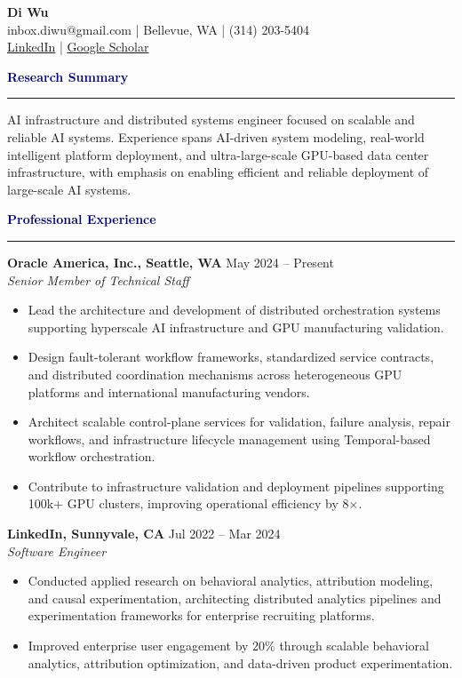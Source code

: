 \documentclass[letter,10pt]{article}
\newcommand{\cvsection}[1]{%
  \vspace{0.5em}
  {\large\textbf{\textcolor{navy}{#1}}}\par
  \vspace{0.15em}
  \hrule
  \vspace{0.35em}
}
\newcommand{\cventry}[3]{%
  \textbf{#1} \hfill #2\\
  \textit{#3}\par
}
\begin{document}
\begin{center}
{\LARGE \textbf{Di Wu}}\\[0.15em]
inbox.diwu@gmail.com \;|\; Bellevue, WA \;|\; (314) 203-5404\\
\href{https://www.linkedin.com/in/di-wu-2020/}{LinkedIn} \;|\; \href{https://scholar.google.com/citations?user=mqx3Y-gAAAAJ}{Google Scholar}
\end{center}

\cvsection{Research Summary}
AI infrastructure and distributed systems engineer focused on scalable and reliable AI systems. Experience spans AI-driven system modeling, real-world intelligent platform deployment, and ultra-large-scale GPU-based data center infrastructure, with emphasis on enabling efficient and reliable deployment of large-scale AI systems.

\cvsection{Professional Experience}


\cventry{Oracle America, Inc., Seattle, WA}{May 2024 -- Present}{Senior Member of Technical Staff}
\begin{itemize}
  \item Lead the architecture and development of distributed orchestration systems supporting hyperscale AI infrastructure and GPU manufacturing validation.
  \item Design fault-tolerant workflow frameworks, standardized service contracts, and distributed coordination mechanisms across heterogeneous GPU platforms and international manufacturing vendors.
  \item Architect scalable control-plane services for validation, failure analysis, repair workflows, and infrastructure lifecycle management using Temporal-based workflow orchestration.
  \item Contribute to infrastructure validation and deployment pipelines supporting 100k+ GPU clusters, improving operational efficiency by 8$\times$.
\end{itemize}

\cventry{LinkedIn, Sunnyvale, CA}{Jul 2022 -- Mar 2024}{Software Engineer}
\begin{itemize}
  \item Conducted applied research on behavioral analytics, attribution modeling, and causal experimentation, architecting distributed analytics pipelines and experimentation frameworks for enterprise recruiting platforms.
  \item Improved enterprise user engagement by 20\% through scalable behavioral analytics, attribution optimization, and data-driven product experimentation.
\end{itemize}
\end{document}
